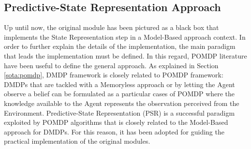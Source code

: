         \subsection{Predictive-State Representation Approach}
            Up until now, the original module has been pictured as a black box that implements the State Representation step in a Model-Based approach context. In order to further explain the details of the implementation, the main paradigm that leads the implementation must be defined. In this regard, POMDP literature have been useful to define the general approach. As explained in Section \ref{sota:pomdp}, DMDP framework is closely related to POMDP framework: DMDPs that are tackled with a Memoryless approach or by letting the Agent observe a belief can be formulated as a particular cases of POMDP where the knowledge available to the Agent represents the observation perceived from the Environment. Predictive-State Representation (PSR) is a successful paradigm exploited by POMDP algorithms that is closely related to the Model-Based approach for DMDPs. For this reason, it has been adopted for guiding the practical implementation of the original modules.
            
